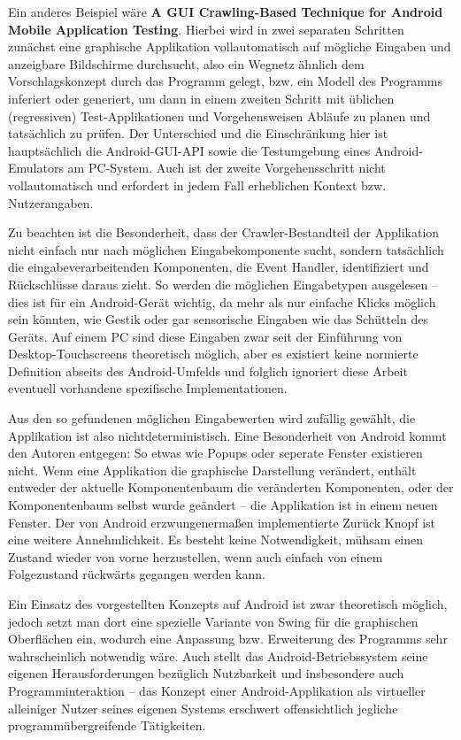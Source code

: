 Ein anderes Beispiel wäre \textbf{\glqq{}A GUI Crawling-Based Technique for Android Mobile Application
Testing\grqq{}}\cite{AGCBTFAMAT}. Hierbei wird in zwei separaten Schritten zunächst eine graphische Applikation
vollautomatisch auf mögliche Eingaben und anzeigbare Bildschirme durchsucht, also ein
\glqq{}Wegnetz\grqq{} ähnlich dem Vorschlagskonzept durch das Programm gelegt, bzw.
ein Modell des Programms inferiert oder generiert, um dann in einem zweiten
Schritt mit üblichen (regressiven) Test-Applikationen und Vorgehensweisen Abläufe zu
planen und tatsächlich zu prüfen. Der Unterschied und die Einschränkung hier ist
hauptsächlich die Android-GUI-API sowie die Testumgebung eines Android-Emulators am
PC-System. Auch ist der zweite Vorgehensschritt nicht vollautomatisch und erfordert in jedem Fall
erheblichen Kontext bzw. Nutzerangaben.

Zu beachten ist die Besonderheit, dass der Crawler-Bestandteil der Applikation nicht
einfach nur nach möglichen Eingabekomponente sucht, sondern tatsächlich die
eingabeverarbeitenden Komponenten, die \glqq{}Event Handler\grqq{}, identifiziert
und Rückschlüsse daraus zieht. So werden die möglichen Eingabetypen ausgelesen --
dies ist für ein Android-Gerät wichtig, da mehr als nur einfache \glqq{}Klicks\grqq{}
möglich sein könnten, wie Gestik oder gar sensorische Eingaben wie das Schütteln
des Geräts. Auf einem PC sind diese Eingaben zwar seit der Einführung von
Desktop-Touchscreens theoretisch möglich, aber es existiert keine normierte
Definition abseits des Android-Umfelds und folglich ignoriert diese Arbeit
eventuell vorhandene spezifische Implementationen.

Aus den so gefundenen möglichen Eingabewerten wird zufällig gewählt,
die Applikation ist also nichtdeterministisch. Eine Besonderheit von Android
kommt den Autoren entgegen: So etwas wie Popups oder seperate Fenster existieren nicht.
Wenn eine Applikation die graphische Darstellung verändert, enthält entweder
der aktuelle Komponentenbaum die veränderten Komponenten, oder der
Komponentenbaum selbst wurde geändert -- die Applikation ist in einem neuen Fenster.
Der von Android erzwungenermaßen implementierte \glqq{}Zurück\grqq{} Knopf ist
eine weitere Annehmlichkeit. Es besteht keine Notwendigkeit, mühsam einen Zustand wieder
von vorne herzustellen, wenn auch einfach von einem Folgezustand rückwärts
gegangen werden kann.

Ein Einsatz des vorgestellten Konzepts auf Android ist zwar theoretisch möglich, jedoch setzt
man dort eine spezielle Variante von Swing für die graphischen Oberflächen ein, 
wodurch eine Anpassung bzw. Erweiterung des Programms sehr wahrscheinlich notwendig wäre. 
Auch stellt das Android-Betriebssystem seine eigenen Herausforderungen
bezüglich Nutzbarkeit und insbesondere auch Programminteraktion -- das Konzept
einer Android-Applikation als virtueller alleiniger Nutzer seines eigenen Systems
erschwert offensichtlich jegliche programmübergreifende Tätigkeiten.

